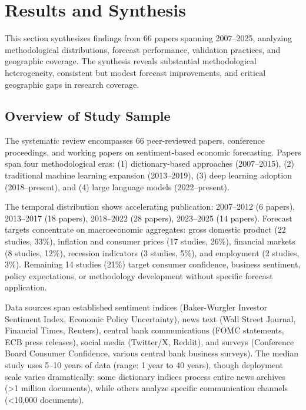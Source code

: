 
\section{Results and Synthesis}

This section synthesizes findings from 66 papers spanning 2007--2025, analyzing methodological distributions, forecast performance, validation practices, and geographic coverage. The synthesis reveals substantial methodological heterogeneity, consistent but modest forecast improvements, and critical geographic gaps in research coverage.

\subsection{Overview of Study Sample}

The systematic review encompasses 66 peer-reviewed papers, conference proceedings, and working papers on sentiment-based economic forecasting. Papers span four methodological eras: (1) dictionary-based approaches (2007--2015), (2) traditional machine learning expansion (2013--2019), (3) deep learning adoption (2018--present), and (4) large language models (2022--present). 

The temporal distribution shows accelerating publication: 2007--2012 (6 papers), 2013--2017 (18 papers), 2018--2022 (28 papers), 2023--2025 (14 papers). Forecast targets concentrate on macroeconomic aggregates: gross domestic product (22 studies, 33\%), inflation and consumer prices (17 studies, 26\%), financial markets (8 studies, 12\%), recession indicators (3 studies, 5\%), and employment (2 studies, 3\%). Remaining 14 studies (21\%) target consumer confidence, business sentiment, policy expectations, or methodology development without specific forecast application.

Data sources span established sentiment indices (Baker-Wurgler Investor Sentiment Index, Economic Policy Uncertainty), news text (Wall Street Journal, Financial Times, Reuters), central bank communications (FOMC statements, ECB press releases), social media (Twitter/X, Reddit), and surveys (Conference Board Consumer Confidence, various central bank business surveys). The median study uses 5--10 years of data (range: 1 year to 40 years), though deployment scale varies dramatically: some dictionary indices process entire news archives (>1 million documents), while others analyze specific communication channels (<10,000 documents).

